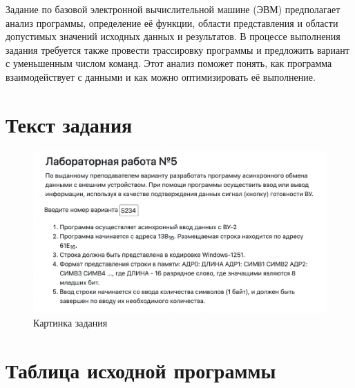 \documentclass[14pt]{extreport}
\begin{document}
    \pagestyle{empty} %
    

    \pagestyle{plain} %
    \tableofcontents
    \intro Задание по базовой электронной вычислительной машине (ЭВМ) предполагает анализ программы, определение её функции, области представления и области допустимых значений исходных данных и результатов. В процессе выполнения задания требуется также провести трассировку программы и предложить вариант с уменьшенным числом команд. Этот анализ поможет понять, как программа взаимодействует с данными и как можно оптимизировать её выполнение.

    \chapter{Текст задания}


        \begin{figure}[!h]
            \centering
            \includegraphics[width=0.8\linewidth]{task.png}
            \caption{Картинка задания}

        \end{figure}


    \chapter{Таблица исходной программы}
\end{document}
